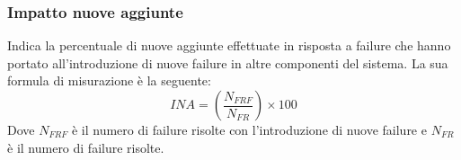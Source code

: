 		\subsubsection{Impatto nuove aggiunte} Indica la percentuale di nuove aggiunte effettuate in risposta a failure che hanno portato
all’introduzione di nuove failure in altre componenti del sistema. La sua formula
		di misurazione è la seguente:
\newline
		\[
		INA=(\frac{N_{FRF}}{N_{FR}}) \times 100
		\]
		Dove $N_{FRF}$ è il numero di failure risolte con l’introduzione di nuove failure e $N_{FR}$
		è il numero di failure risolte.